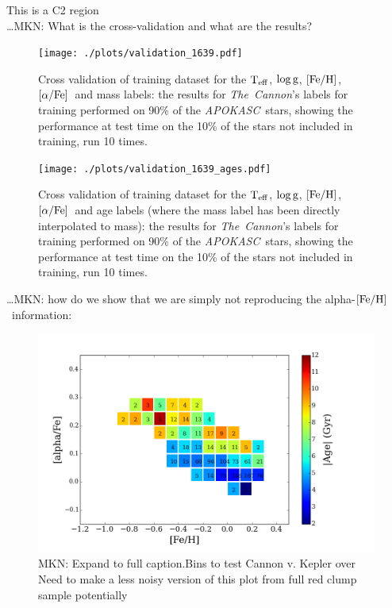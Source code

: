 \documentclass[12pt, preprint]{aastex}
\newcommand{\project}[1]{\textsl{#1}}
\newcommand{\tc}{\project{The~Cannon}}
\newcommand{\apokasc}{\project{APOKASC}}
\newcommand{\teff}{\mbox{$\rm T_{eff}$}}
\newcommand{\feh}{\mbox{$\rm [Fe/H]$}}
\newcommand{\alphafe}{\mbox{$\rm [\alpha/Fe]$}}
\newcommand{\logg}{\mbox{$\rm \log g$}}
\begin{document}
This is a C2 region \\

\ldots MKN: What is the cross-validation and what are the results?
\begin{figure}[p!]
\centering
        \texttt{[image: ./plots/validation\_1639.pdf]}
  \caption{Cross validation of training dataset for the \teff, \logg, \feh, \alphafe\ and mass labels: the results for \tc's labels for training performed on 90\% of the \apokasc\ stars, showing the performance at test time on the 10\% of the stars not included in training, run 10 times.}
\label{fig:validation}
\end{figure}

\begin{figure}[p!]
\centering
        \texttt{[image: ./plots/validation\_1639\_ages.pdf]}
  \caption{Cross validation of training dataset for the \teff, \logg, \feh, \alphafe\ and age labels (where the mass label has been directly interpolated to mass): the results for \tc's labels for training performed on 90\% of the \apokasc\ stars, showing the performance at test time on the 10\% of the stars not included in training, run 10 times.}
\label{fig:validation}
\end{figure}


\ldots MKN: how do we show that we are simply not reproducing the alpha-\feh\ information:

\begin{figure}[p!]
\centering
    \includegraphics[scale=0.31]{./plots/alpha_feh_bins.png}
    \caption{MKN: Expand to full caption.Bins to test Cannon v. Kepler over  Need to make a less noisy version of this plot from full red clump sample potentially  }
\label{fig:alphabins}
\end{figure}
\end{document}
